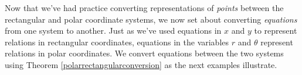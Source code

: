 \medskip

Now that we've had practice converting representations of \textit{points} between the rectangular and polar coordinate systems, we now set about converting \textit{equations} from one system to another.  Just as we've used equations in $x$ and $y$ to represent relations in rectangular coordinates, equations in the variables $r$ and $\theta$ represent relations in polar coordinates.  We convert equations between the two systems using Theorem \ref{polarrectangularconversion} as the next examples illustrate.

\medskip

